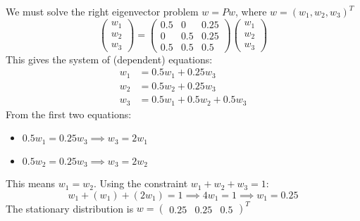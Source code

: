 \documentclass[aspectratio=169]{beamer}\usepackage[]{graphicx}\usepackage[]{xcolor}
\begin{document}
\begin{frame}
We must solve the right eigenvector problem $w = Pw$, where $w = (w_1, w_2, w_3)^T$
\[
\begin{pmatrix} w_1 \\ w_2 \\ w_3 \end{pmatrix}
=
\begin{pmatrix}
0.5 & 0 & 0.25 \\
0 & 0.5 & 0.25 \\
0.5 & 0.5 & 0.5
\end{pmatrix}
\begin{pmatrix} w_1 \\ w_2 \\ w_3 \end{pmatrix}
\]
This gives the system of (dependent) equations:
\begin{align*}
w_1 &= 0.5 w_1 + 0.25 w_3 \\
w_2 &= 0.5 w_2 + 0.25 w_3 \\
w_3 &= 0.5 w_1 + 0.5 w_2 + 0.5 w_3
\end{align*}
From the first two equations:
\begin{itemize}
    \item $0.5 w_1 = 0.25 w_3 \implies w_3 = 2w_1$
    \item $0.5 w_2 = 0.25 w_3 \implies w_3 = 2w_2$
\end{itemize}
\vfill
This means $w_1 = w_2$. Using the constraint $w_1+w_2+w_3 = 1$:
\[
w_1 + (w_1) + (2w_1) = 1 \implies 4w_1 = 1 \implies w_1 = 0.25
\]
\vfill
The stationary distribution is $w = \begin{pmatrix} 0.25 & 0.25 & 0.5 \end{pmatrix}^T$
\end{frame}
\end{document}
